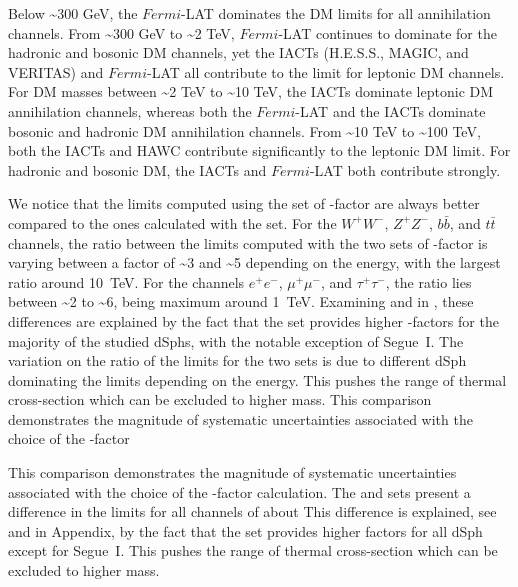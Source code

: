 Below \textasciitilde300 GeV, the $Fermi$-LAT dominates the DM limits for all annihilation channels.
From \textasciitilde300 GeV to \textasciitilde2 TeV, $Fermi$-LAT continues to dominate for the hadronic and bosonic DM channels, yet the IACTs (H.E.S.S., MAGIC, and VERITAS) and $Fermi$-LAT all contribute to the limit for leptonic DM channels.
For DM masses between \textasciitilde2 TeV to \textasciitilde10 TeV, the IACTs dominate leptonic DM annihilation channels, whereas both the $Fermi$-LAT and the IACTs dominate bosonic and hadronic DM annihilation channels.
From \textasciitilde10 TeV to \textasciitilde100 TeV, both the IACTs and HAWC contribute significantly to the leptonic DM limit.
For hadronic and bosonic DM, the IACTs and $Fermi$-LAT both contribute strongly.

We notice that the limits computed using the \B set of \J-factor are always better compared to the ones calculated with the \GS set.
For the $W^+W^-$, $Z^+Z^-$, $b\bar{b}$, and $t\bar{t}$ channels, the ratio between the limits computed with the two sets of \J-factor is varying between a factor of \textasciitilde3 and \textasciitilde5 depending on the energy, with the largest ratio around 10~TeV.
For the channels $e^+e^-$, $\mu^+\mu^-$, and $\tau^+\tau^-$, the ratio lies between \textasciitilde2 to \textasciitilde6, being maximum around 1~TeV.
Examining  and  in , these differences are explained by the fact that the \B set provides higher \J-factors for the majority of the studied dSphs, with the notable exception of Segue~I.
The variation on the ratio of the limits for the two sets is due to different dSph dominating the limits depending on the energy.
This pushes the range of thermal cross-section which can be excluded to higher mass.
This comparison demonstrates the magnitude of systematic uncertainties associated with the choice of the \J-factor

This comparison demonstrates the magnitude of systematic uncertainties associated with the choice of the \J-factor calculation.
The \GS and \B sets present a difference in the limits for all channels of about
This difference is explained, see   and  in Appendix, by the fact that the \B set provides higher \J factors for all dSph except for Segue~I. This pushes the range of thermal cross-section which can be excluded to higher mass.

